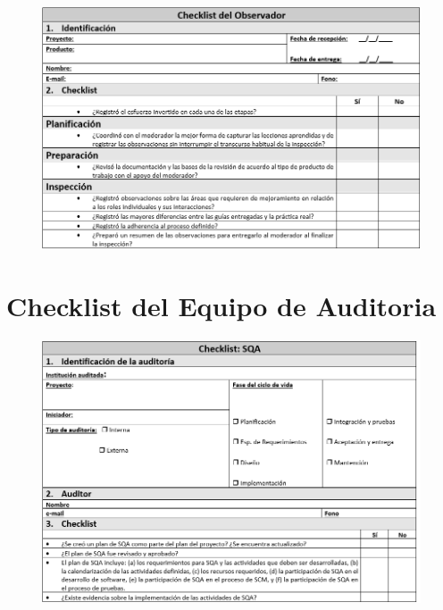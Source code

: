 \begin{figure}[H]
\centering
\includegraphics[width=1\textwidth]{figures/anexos/4-6.PNG}
\end{figure}

\section{Checklist del Equipo de Auditoria}

\begin{figure}[H]
\centering
\includegraphics[width=1\textwidth]{figures/anexos/5-1.PNG}
\end{figure}


